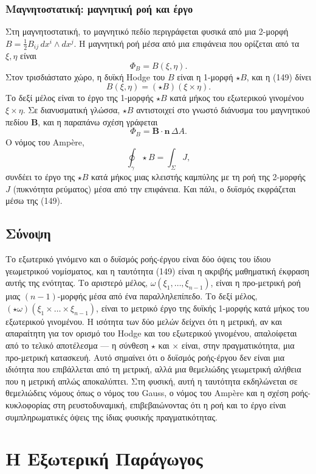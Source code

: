 \documentclass[12pt]{article}
\begin{document}
\subsubsection{Μαγνητοστατική: μαγνητική ροή και έργο}

Στη μαγνητοστατική, το μαγνητικό πεδίο περιγράφεται φυσικά από μια 2-μορφή $B = \frac{1}{2} B_{ij} \, dx^i \wedge dx^j$. Η μαγνητική ροή μέσα από μια επιφάνεια που ορίζεται από τα $\xi, \eta$ είναι
\[
\Phi_B = B(\xi, \eta).
\]
Στον τρισδιάστατο χώρο, η δυϊκή Hodge του $B$ είναι η 1-μορφή $\star B$, και η (149) δίνει
\[
B(\xi, \eta) = (\star B)(\xi \times \eta).
\]
Το δεξί μέλος είναι το έργο της 1-μορφής $\star B$ κατά μήκος του εξωτερικού γινομένου $\xi \times \eta$. Σε διανυσματική γλώσσα, $\star B$ αντιστοιχεί στο γνωστό διάνυσμα του μαγνητικού πεδίου $\mathbf{B}$, και η παραπάνω σχέση γράφεται
\[
\Phi_B = \mathbf{B} \cdot \mathbf{n} \, \Delta A.
\]
Ο νόμος του Amp\`ere,
\[
\oint_\gamma \star B = \int_\Sigma J,
\]
συνδέει το έργο της $\star B$ κατά μήκος μιας κλειστής καμπύλης με τη ροή της 2-μορφής $J$ (πυκνότητα ρεύματος) μέσα από την επιφάνεια. Και πάλι, ο δυϊσμός εκφράζεται μέσω της (149).

\subsection{Σύνοψη}

Το εξωτερικό γινόμενο και ο δυϊσμός ροής-έργου είναι δύο όψεις του ίδιου γεωμετρικού νομίσματος, και η ταυτότητα (149) είναι η ακριβής μαθηματική έκφραση αυτής της ενότητας. Το αριστερό μέλος, $\omega(\xi_1, \dots, \xi_{n-1})$, είναι η προ-μετρική ροή μιας $(n-1)$-μορφής μέσα από ένα παραλληλεπίπεδο. Το δεξί μέλος, $(\star \omega)(\xi_1 \times \dots \times \xi_{n-1})$, είναι το μετρικό έργο της δυϊκής 1-μορφής κατά μήκος του εξωτερικού γινομένου. Η ισότητα των δύο μελών δείχνει ότι η μετρική, αν και απαραίτητη για τον ορισμό του Hodge και του εξωτερικού γινομένου, απαλοίφεται από το τελικό αποτέλεσμα — η σύνθεση $\star$ και $\times$ είναι, στην πραγματικότητα, μια προ-μετρική κατασκευή. Αυτό σημαίνει ότι ο δυϊσμός ροής-έργου δεν είναι μια ιδιότητα που επιβάλλεται από τη μετρική, αλλά μια θεμελιώδης γεωμετρική αλήθεια που η μετρική απλώς αποκαλύπτει. Στη φυσική, αυτή η ταυτότητα εκδηλώνεται σε θεμελιώδεις νόμους όπως ο νόμος του Gauss, ο νόμος του Amp\`ere και η σχέση ροής-κυκλοφορίας στη ρευστοδυναμική, επιβεβαιώνοντας ότι η ροή και το έργο είναι συμπληρωματικές όψεις της ίδιας φυσικής πραγματικότητας.

\section{Η Εξωτερική Παράγωγος}
\end{document}

